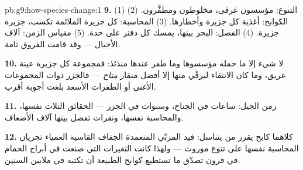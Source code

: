 \begin{solution}{pb:g9:how-species-change:1}
\textbf{9.} (1) التنوع: مؤسسون غرقى، مخلوطون
ومطفَّرون. (2) الكوابح: أغذية كل جزيرة وأخطارها. (3)
المحاسبة:  كل جزيرة الملائمة تكسب، جزيرة جزيرة.
(4) الفصل: البحر بينها، يمسك كل دفتر على حدة. (5) مقياس
الزمن: آلاف الأجيال --- وقد قامت الفروق تامة.

\textbf{10.} لا شيء إلا ما حمله مؤسسوها وما طفر عندها
منذئذ: فمجموعة كل جزيرة عينة غريق، وما كان الانتقاء
ليرقّي منها إلا أفضل منقار \emph{متاح} --- فالجزر ذوات
المجموعات الأغنى أو الطفرات الأسعد بلغت أجوبة أقرب.

\textbf{11.} زمن الجيل: ساعات في الجناح، وسنوات في
الجزر --- الحقائق الثلاث نفسها، والمحاسبة نفسها، ونقرات
تفصل بينها آلاف الأضعاف.

\textbf{12.} كلاهما كابح يقرر من يتناسل: فيد المربّي
المتعمدة  الجفاف القاسية العمياء تجريان المحاسبة
نفسها على تنوع موروث --- ولهذا كانت التغيرات التي صنعت
في أبراج الحمام في قرون تصدّق ما تستطيع كوابح الطبيعة أن
تكتبه في ملايين السنين.
\end{solution}
